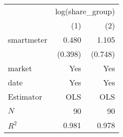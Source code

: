 \begin{tabular}{lrr}
\toprule
           & \multicolumn{2}{c}{log(share_group)} \\ 
\cmidrule(lr){2-3} 
           &     (1) &                        (2) \\ 
\midrule
smartmeter &   0.480 &                      1.105 \\ 
           & (0.398) &                    (0.748) \\ 
\midrule
market     &     Yes &                        Yes \\ 
date       &     Yes &                        Yes \\ 
\midrule
Estimator  &     OLS &                        OLS \\ 
\midrule
$N$        &      90 &                         90 \\ 
$R^2$      &   0.981 &                      0.978 \\ 
\bottomrule
\end{tabular}
